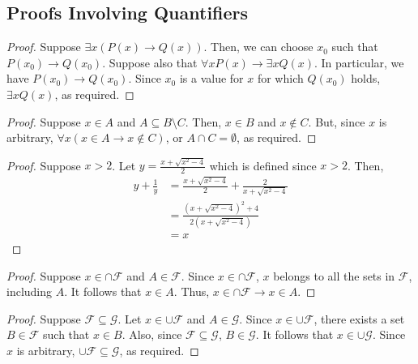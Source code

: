 \documentclass[12pt,letterpaper]{exam}
\begin{document}
\subsection{Proofs Involving Quantifiers}
\begin{questions}
    \question
    \begin{proof}
        Suppose $\exists x(P(x) \rightarrow Q(x))$. 
        Then, we can choose $x_0$ such that $P(x_0) \rightarrow Q(x_0)$.
        Suppose also that $\forall xP(x) \rightarrow \exists x Q(x)$.
        In particular, we have $P(x_0) \rightarrow Q(x_0)$.
        Since $x_0$ is a value for $x$ for which $Q(x_0)$ holds, $\exists xQ(x)$, as required.
    \end{proof}

    \setcounter{question}{2}

    \question
    \begin{proof}
        Suppose $x \in A$ and $A \subseteq B \setminus C$.
        Then, $x \in B$ and $x \not\in C$.
        But, since $x$ is arbitrary, $\forall x(x \in A \rightarrow x \not\in C)$,
        or $A \cap C = \emptyset$, as required.
    \end{proof}

    \setcounter{question}{6}
    \question
    \begin{proof}
        Suppose $x > 2$. Let $y = \frac{x + \sqrt{x^2 - 4}}{2}$ which is defined since $x > 2$.
        Then,
        \begin{align*}
            y + \frac{1}{y} &= \frac{x + \sqrt{x^2 - 4}}{2} + \frac{2}{x + \sqrt{x^2 - 4}} \\
            &= \frac{(x + \sqrt{x^2 - 4})^2 + 4}{2(x + \sqrt{x^2 - 4})} \\
            &= x
        \end{align*}
    \end{proof}

    \setcounter{question}{8}
    \question
    \begin{proof}
        Suppose $x \in \cap \mathcal{F}$ and $A \in \mathcal{F}$.
        Since $x \in \cap \mathcal{F}$, $x$ belongs to all the sets in $\mathcal{F}$, including $A$.
        It follows that $x \in A$.
        Thus, $x \in \cap \mathcal{F} \rightarrow x \in A$.
    \end{proof}

    \setcounter{question}{11}
    \question
    \begin{proof}
        Suppose $\mathcal{F} \subseteq \mathcal{G}$.
        Let $x \in \cup \mathcal{F}$ and $A \in \mathcal{G}$.
        Since $x \in \cup \mathcal{F}$, there exists a set $B \in \mathcal{F}$ such that $x \in B$.
        Also, since $\mathcal{F} \subseteq \mathcal{G}$, $B \in \mathcal{G}$.
        It follows that $x \in \cup \mathcal G$.
        Since $x$ is arbitrary, $\cup \mathcal F \subseteq \mathcal G$, as required. 
    \end{proof}


\end{questions}
\end{document}

